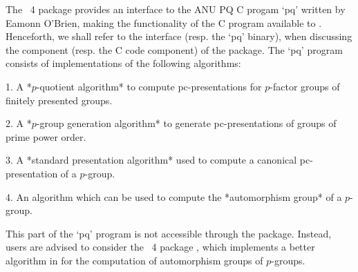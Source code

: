 

The {\GAP}~4 package {\ANUPQ} provides an  interface  to  the  ANU  PQ  C
progam `pq' written by Eamonn O'Brien, making the functionality of the  C
program available to {\GAP}. Henceforth, we shall refer to  the  {\ANUPQ}
interface (resp. the `pq' binary), when discussing the  {\GAP}  component
(resp. the C code component) of the {\ANUPQ} package.  The  `pq'  program
consists of implementations of the following algorithms:

\beginlist

\item{1.}
A *$p$-quotient algorithm* to  compute  pc-presentations  for  $p$-factor
groups of finitely presented groups.


\item{2.} 
A *$p$-group generation algorithm* to generate pc-presentations of groups
of prime power order.


\item{3.}
A  *standard  presentation  algorithm*  used  to  compute   a   canonical
pc-presentation of a $p$-group.


\item{4.} 
An algorithm which can be used to compute the *automorphism group*  of  a
$p$-group.

\item{}
This part of the `pq' program is  not  accessible  through  the  {\ANUPQ}
package. Instead, users are advised  to  consider  the  {\GAP}~4  package
{\AutPGrp}, which  implements  a  better  algorithm  in  {\GAP}  for  the
computation of automorphism groups of $p$-groups.

